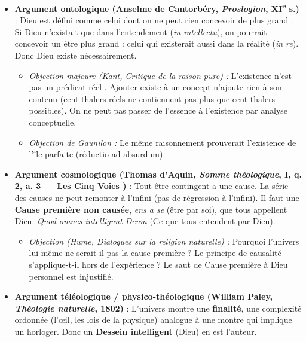 \documentclass[11pt]{article}
\begin{document}
\begin{propriete}
\begin{itemize}
    \item \textbf{Argument ontologique (Anselme de Cantorbéry, \emph{Proslogion}, XI\textsuperscript{e} s.)} : Dieu est défini comme \guillemotleft celui dont on ne peut rien concevoir de plus grand \guillemotright. Si Dieu n'existait que dans l'entendement (\emph{in intellectu}), on pourrait concevoir un être plus grand : celui qui existerait aussi dans la réalité (\emph{in re}). Donc Dieu existe nécessairement.
    \begin{itemize}
        \item \textit{Objection majeure (Kant, \emph{Critique de la raison pure}) :} \guillemotleft L'existence n'est pas un prédicat réel \guillemotright. Ajouter \guillemotleft existe \guillemotright à un concept n'ajoute rien à son contenu (cent thalers réels ne contiennent pas plus que cent thalers possibles). On ne peut pas passer de l'essence à l'existence par analyse conceptuelle.
        \item \textit{Objection de Gaunilon :} Le même raisonnement prouverait l'existence de \guillemotleft l'île parfaite \guillemotright (réductio ad absurdum).
    \end{itemize}
    \item \textbf{Argument cosmologique (Thomas d'Aquin, \emph{Somme théologique}, I, q. 2, a. 3 — \guillemotleft Les Cinq Voies \guillemotright)} : Tout être contingent a une cause. La série des causes ne peut remonter à l'infini (pas de régression à l'infini). Il faut une \textbf{Cause première non causée}, \emph{ens a se} (être par soi), que tous appellent Dieu. \guillemotleft \emph{Quod omnes intelligunt Deum} \guillemotright (Ce que tous entendent par Dieu).
    \begin{itemize}
        \item \textit{Objection (Hume, \emph{Dialogues sur la religion naturelle}) :} Pourquoi l'univers lui-même ne serait-il pas la cause première ? Le principe de causalité s'applique-t-il hors de l'expérience ? Le saut de \guillemotleft Cause première \guillemotright à \guillemotleft Dieu personnel \guillemotright est injustifié.
    \end{itemize}
    \item \textbf{Argument téléologique / physico-théologique (William Paley, \emph{Théologie naturelle}, 1802)} : L'univers montre une \textbf{finalité}, une complexité ordonnée (l'œil, les lois de la physique) analogue à une montre qui implique un horloger. Donc un \textbf{Dessein intelligent} (Dieu) en est l'auteur.

\end{itemize}
\end{propriete}
\end{document}
